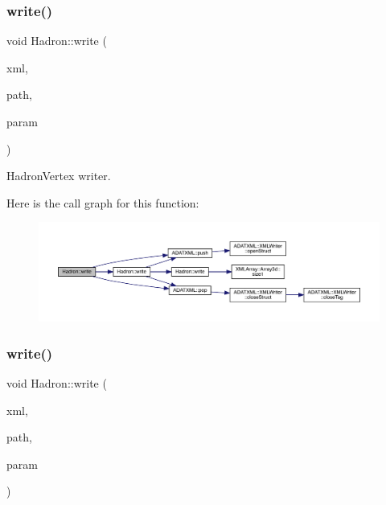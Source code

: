 \subsubsection{\texorpdfstring{write()}{write()}\hspace{0.1cm}{\footnotesize\ttfamily [49/95]}}
{\footnotesize\ttfamily void Hadron\+::write (\begin{DoxyParamCaption}\item[{\mbox{\hyperlink{classADATXML_1_1XMLWriter}{X\+M\+L\+Writer}} \&}]{xml,  }\item[{const std\+::string \&}]{path,  }\item[{const \mbox{\hyperlink{structHadron_1_1HadronVertex__t}{Hadron\+Vertex\+\_\+t}} \&}]{param }\end{DoxyParamCaption})}



Hadron\+Vertex writer. 

Here is the call graph for this function\+:\nopagebreak
\begin{figure}[H]
\begin{center}
\leavevmode
\includegraphics[width=350pt]{d1/daf/namespaceHadron_a9309edc67ae704a831f01ae854c5bf12_cgraph}
\end{center}
\end{figure}
\mbox{\label{namespaceHadron_a9d260315c8fc49d172ff22fd3abb49c9}} 
\subsubsection{\texorpdfstring{write()}{write()}\hspace{0.1cm}{\footnotesize\ttfamily [50/95]}}
{\footnotesize\ttfamily void Hadron\+::write (\begin{DoxyParamCaption}\item[{\mbox{\hyperlink{classADATXML_1_1XMLWriter}{X\+M\+L\+Writer}} \&}]{xml,  }\item[{const std\+::string \&}]{path,  }\item[{const \mbox{\hyperlink{structHadron_1_1KeyPeramDist__t}{Key\+Peram\+Dist\+\_\+t}} \&}]{param }\end{DoxyParamCaption})}



